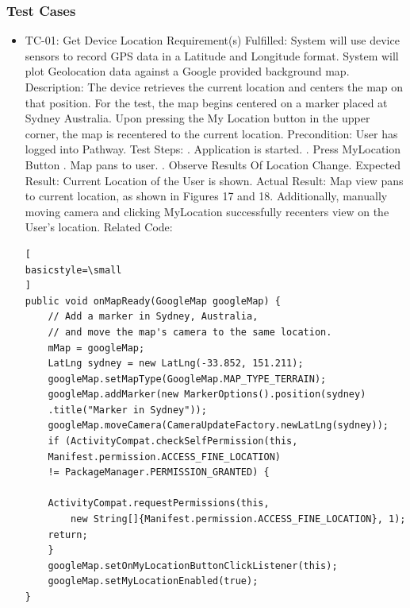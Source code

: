 ﻿\documentclass{article}
\begin{document}
\subsubsection{Test Cases}
\begin {itemize}
\item TC-01: Get Device Location
\subitem Requirement(s) Fulfilled:
\subsubitem System will use device sensors to record GPS data in a Latitude and Longitude format.
\subsubitem System will plot Geolocation data against a Google provided background map.
\subitem Description: The device retrieves the current location and centers the map on that position. For the test, the map begins centered on a marker placed at Sydney Australia. Upon pressing the My Location button in the upper corner, the map is recentered to the current location.
\subitem Precondition: User has logged into Pathway.
\subitem Test Steps:
. Application is started.
. Press MyLocation Button
. Map pans to user.
. Observe Results Of Location Change.
\subitem Expected Result: Current Location of the User is shown.
\subitem Actual Result: Map view pans to current location, as shown in Figures 17 and 18.
\subsubitem Additionally, manually moving camera and clicking MyLocation successfully recenters view on the User's location.
\subitem Related Code:
\begin{lstlisting}[
basicstyle=\small
]
public void onMapReady(GoogleMap googleMap) {
    // Add a marker in Sydney, Australia,
    // and move the map's camera to the same location.
    mMap = googleMap;
    LatLng sydney = new LatLng(-33.852, 151.211);
    googleMap.setMapType(GoogleMap.MAP_TYPE_TERRAIN);
    googleMap.addMarker(new MarkerOptions().position(sydney)
    .title("Marker in Sydney"));
    googleMap.moveCamera(CameraUpdateFactory.newLatLng(sydney));
    if (ActivityCompat.checkSelfPermission(this,
    Manifest.permission.ACCESS_FINE_LOCATION)
    != PackageManager.PERMISSION_GRANTED) {

    ActivityCompat.requestPermissions(this,
        new String[]{Manifest.permission.ACCESS_FINE_LOCATION}, 1);
    return;
    }
    googleMap.setOnMyLocationButtonClickListener(this);
    googleMap.setMyLocationEnabled(true);
}
\end{lstlisting}



\end{itemize}
\end{document}
